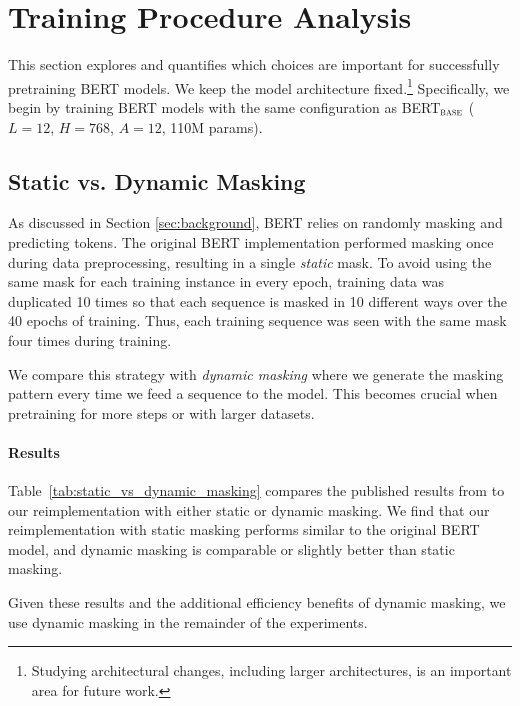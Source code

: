 \section{Training Procedure Analysis} \label{sec:design}

This section explores and quantifies which choices are important for successfully pretraining BERT models.
We keep the model architecture fixed.\footnote{Studying architectural changes, including larger architectures, is an important area for future work.} 
Specifically, we begin by training BERT models with the same configuration as BERT$_{\textsc{base}}$ ($L=12$,
$H=768$, $A=12$, 110M params).



\subsection{Static vs. Dynamic Masking} \label{sec:dynamic_masking}

As discussed in Section \ref{sec:background}, BERT relies on randomly masking and predicting tokens. 
The original BERT implementation performed masking once during data preprocessing, resulting in a single \emph{static} mask.
To avoid using the same mask for each training instance in every epoch, training data was duplicated 10 times so that each sequence is masked in 10 different ways over the 40 epochs of training.
Thus, each training sequence was seen with the same mask four times during training.

We compare this strategy with \emph{dynamic masking} where we generate the masking pattern every time we feed a sequence to the model.
This becomes crucial when pretraining for more steps or with larger datasets.

\paragraph{Results}



Table~\ref{tab:static_vs_dynamic_masking} compares the published \bertbase{} results from  to our reimplementation with either static or dynamic masking.
We find that our reimplementation with static masking performs similar to the original BERT model, and dynamic masking is comparable or slightly better than static masking.

Given these results and the additional efficiency benefits of dynamic masking, we use dynamic masking in the remainder of the experiments.



